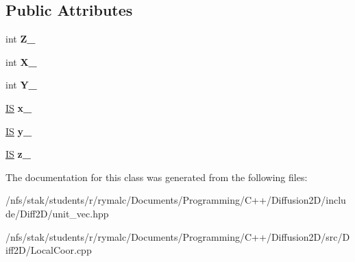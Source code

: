 \subsection*{Public Attributes}
\begin{DoxyCompactItemize}
\item 
\hypertarget{classLocalCoor_acd97c2eb7e3b994dbc58ae98ab785280}{int {\bfseries Z\+\_\+}}\label{classLocalCoor_acd97c2eb7e3b994dbc58ae98ab785280}

\item 
\hypertarget{classLocalCoor_a7d72e3489aaf1b6579f7a3e0f5b30e26}{int {\bfseries X\+\_\+}}\label{classLocalCoor_a7d72e3489aaf1b6579f7a3e0f5b30e26}

\item 
\hypertarget{classLocalCoor_a5ff6668d5d6898582ddfdc5eadce58ff}{int {\bfseries Y\+\_\+}}\label{classLocalCoor_a5ff6668d5d6898582ddfdc5eadce58ff}

\item 
\hypertarget{classLocalCoor_a2c0e974fc45c597f893b20a0c2f6869c}{\hyperlink{structIS}{I\+S} {\bfseries x\+\_\+}}\label{classLocalCoor_a2c0e974fc45c597f893b20a0c2f6869c}

\item 
\hypertarget{classLocalCoor_a58678d9cfb17db349a9d7fd70a2d5150}{\hyperlink{structIS}{I\+S} {\bfseries y\+\_\+}}\label{classLocalCoor_a58678d9cfb17db349a9d7fd70a2d5150}

\item 
\hypertarget{classLocalCoor_acdd6d24c450a43fd755f2e43d16d9991}{\hyperlink{structIS}{I\+S} {\bfseries z\+\_\+}}\label{classLocalCoor_acdd6d24c450a43fd755f2e43d16d9991}

\end{DoxyCompactItemize}


The documentation for this class was generated from the following files\+:\begin{DoxyCompactItemize}
\item 
/nfs/stak/students/r/rymalc/\+Documents/\+Programming/\+C++/\+Diffusion2\+D/include/\+Diff2\+D/unit\+\_\+vec.\+hpp\item 
/nfs/stak/students/r/rymalc/\+Documents/\+Programming/\+C++/\+Diffusion2\+D/src/\+Diff2\+D/Local\+Coor.\+cpp\end{DoxyCompactItemize}
